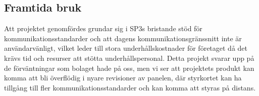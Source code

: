 \documentclass{article}
\begin{document}
        \subsection{Framtida bruk} %
        \label{sub:framtida_bruk}
            Att projektet genomfördes grundar sig i SP3s bristande stöd för kommunikationsstandarder och att dagens kommunikationsgränssnitt inte är användarvänligt, vilket leder till stora underhållskostnader för företaget då det krävs tid och resurser att stötta underhålls\-personal. Detta projekt svarar upp på de förväntningar som bolaget hade på oss, men vi ser att projektets produkt kan komma att bli överflödig i nyare revisioner av panelen, där styrkortet kan ha tillgång till fler kommunikationsstandarder och kan komma att styras på distans.

    \clearpage
    \printbibliography      
    
\end{document}
